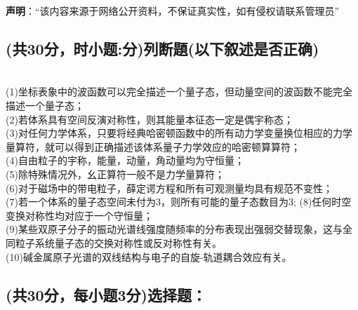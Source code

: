 
\textbf{声明}：“该内容来源于网络公开资料，不保证真实性，如有侵权请联系管理员”

\subsection{(共30分，时小题:分)列断題(以下叙述是否正确)}
\\(1)坐标表象中的波函数可以完全描述一个量子态，但动量空间的波函数不能完全描述一个量子态；\\
(2)若体系具有空间反演对称性，则其能量本征态一定是偶宇称态；\\
(3)对任何力学体系，只要将经典哈密顿函数中的所有动力学变量换位相应的力学量算符，就可以得到正确描述该体系量子力学效应的哈密顿算算符；\\
(4)自由粒子的宇称，能量，动量，角动量均为守恒量；\\
(5)除特殊情况外，幺正算符一般不是力学量算符；\\
(6)对于磁场中的带电粒子，薛定谔方程和所有可观测量均具有规范不变性；\\
(7)若一个体系的量子态空间未付为3，则所有可能的量子态数目为3;
(8)任何时空变换对称性均对应于一个守恒量；\\
(9)某些双原子分子的振动光谱线强度随频率的分布表现出强弱交替现象，这与全同粒子系统量子态的交换对称性或反对称性有关。\\
(10)碱金属原子光谱的双线结构与电子的自旋-轨道耦合效应有关。\\
\subsection{(共30分，每小题3分)选择题：}
